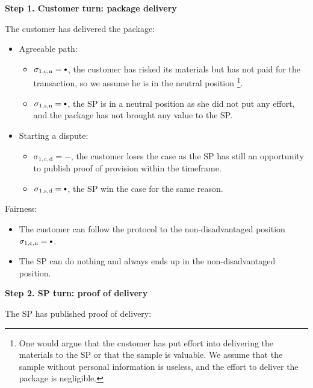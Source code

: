 \documentclass{ieeeaccess}
\newcommand\neutral[1][.75]{\mathbin{\ThisStyle{\vcenter{\hbox{%
  \scalebox{#1}{$\SavedStyle\bullet$}}}}}%
}
\begin{document}
\noindent \textbf
{Step 1. Customer turn: package delivery}\label{step-1-deliver-package}

The customer has delivered the package:

\begin{itemize}
\item Agreeable path:
  \begin{itemize}
  \item
    \(\operatorname{\sigma_{1, c, n} = \neutral}\), the customer has risked its materials but has not paid for the transaction, so we assume he is in the neutral position \footnote{One would argue that the customer has put effort into delivering the materials to the SP or that the sample is valuable. We assume that the sample without personal information is useless, and the effort to deliver the package is negligible.}.
  \item
    \(\operatorname{\sigma_{1, s, n} = \neutral}\), the SP is in a neutral position as she did not put any effort, and the package has not brought any value to the SP.
  \end{itemize}
\item
  Starting a dispute:

  \begin{itemize}
  
  \item
    \(\operatorname{\sigma_{1, c, d} = -}\), the customer loses the case as the SP has still an opportunity to publish proof of provision within the timeframe.
  \item
    \(\operatorname{\sigma_{1, s, d} = \neutral}\), the SP win the case for the same reason.
  \end{itemize}
\end{itemize}

Fairness:

\begin{itemize}

\item
  The customer can follow the protocol to the non-disadvantaged position \(\operatorname{\sigma_{1, c, n} = \neutral}\).
\item
  The SP can do nothing and always ends up in the non-disadvantaged position.
\end{itemize}

\noindent \textbf
{Step 2. SP turn: proof of delivery}\label{step-2-proof-of-delivery}

The SP has published proof of delivery:
\end{document}
